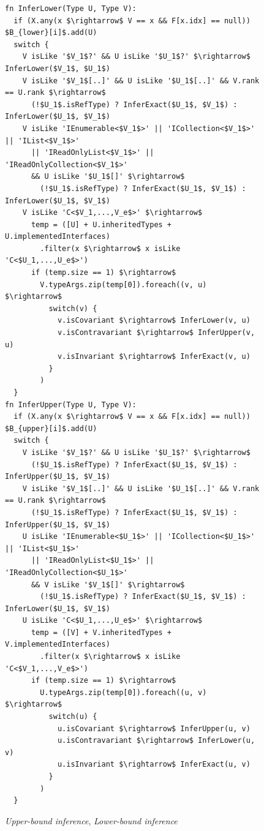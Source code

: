 \begin{figure}
\begin{lstlisting}[style=myAlgo, mathescape=true]
fn InferLower(Type U, Type V):
  if (X.any(x $\rightarrow$ V == x && F[x.idx] == null)) $B_{lower}[i]$.add(U)
  switch {
	V isLike '$V_1$?' && U isLike '$U_1$?' $\rightarrow$ InferLower($V_1$, $U_1$)
	V isLike '$V_1$[..]' && U isLike '$U_1$[..]' && V.rank == U.rank $\rightarrow$
	  (!$U_1$.isRefType) ? InferExact($U_1$, $V_1$) : InferLower($U_1$, $V_1$)
	V isLike 'IEnumerable<$V_1$>' || 'ICollection<$V_1$>' || 'IList<$V_1$>'
	  || 'IReadOnlyList<$V_1$>' || 'IReadOnlyCollection<$V_1$>' 
	  && U isLike '$U_1$[]' $\rightarrow$
	    (!$U_1$.isRefType) ? InferExact($U_1$, $V_1$) : InferLower($U_1$, $V_1$)
	V isLike 'C<$V_1,...,V_e$>' $\rightarrow$
	  temp = ([U] + U.inheritedTypes + U.implementedInterfaces)
	    .filter(x $\rightarrow$ x isLike 'C<$U_1,...,U_e$>')
	  if (temp.size == 1) $\rightarrow$
	    V.typeArgs.zip(temp[0]).foreach((v, u) $\rightarrow$ 
	      switch(v) {
            v.isCovariant $\rightarrow$ InferLower(v, u)
            v.isContravariant $\rightarrow$ InferUpper(v, u)
            v.isInvariant $\rightarrow$ InferExact(v, u)
	      }
	    )
  }
fn InferUpper(Type U, Type V):
  if (X.any(x $\rightarrow$ V == x && F[x.idx] == null)) $B_{upper}[i]$.add(U)
  switch {
	V isLike '$V_1$?' && U isLike '$U_1$?' $\rightarrow$
	  (!$U_1$.isRefType) ? InferExact($U_1$, $V_1$) : InferUpper($U_1$, $V_1$)
	V isLike '$V_1$[..]' && U isLike '$U_1$[..]' && V.rank == U.rank $\rightarrow$
	  (!$U_1$.isRefType) ? InferExact($U_1$, $V_1$) : InferUpper($U_1$, $V_1$)
	U isLike 'IEnumerable<$U_1$>' || 'ICollection<$U_1$>' || 'IList<$U_1$>'
	  || 'IReadOnlyList<$U_1$>' || 'IReadOnlyCollection<$U_1$>' 
	  && V isLike '$V_1$[]' $\rightarrow$
	    (!$U_1$.isRefType) ? InferExact($U_1$, $V_1$) : InferLower($U_1$, $V_1$)
	U isLike 'C<$U_1,...,U_e$>' $\rightarrow$
	  temp = ([V] + V.inheritedTypes + V.implementedInterfaces)
	    .filter(x $\rightarrow$ x isLike 'C<$V_1,...,V_e$>')
	  if (temp.size == 1) $\rightarrow$
	    U.typeArgs.zip(temp[0]).foreach((u, v) $\rightarrow$ 
	      switch(u) {
            u.isCovariant $\rightarrow$ InferUpper(u, v)
            u.isContravariant $\rightarrow$ InferLower(u, v)
            u.isInvariant $\rightarrow$ InferExact(u, v)
	      }
	    )
  }
\end{lstlisting}
\caption{\textit{Upper-bound inference}, \textit{Lower-bound inference}}
\label{img72:methodTypeInference3}
\end{figure}
\par
